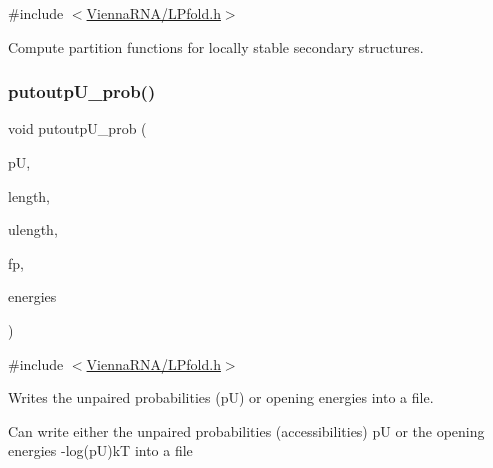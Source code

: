 {\ttfamily \#include $<$\mbox{\hyperlink{_l_pfold_8h}{Vienna\+R\+N\+A/\+L\+Pfold.\+h}}$>$}



Compute partition functions for locally stable secondary structures. 

\mbox{\label{group__local__pf__fold_ga0bcb751860bbf34e3dfee8c2fbdb3ef3}} 
\subsubsection{\texorpdfstring{putoutp\+U\+\_\+prob()}{putoutpU\_prob()}}
{\footnotesize\ttfamily void putoutp\+U\+\_\+prob (\begin{DoxyParamCaption}\item[{double $\ast$$\ast$}]{pU,  }\item[{int}]{length,  }\item[{int}]{ulength,  }\item[{F\+I\+LE $\ast$}]{fp,  }\item[{int}]{energies }\end{DoxyParamCaption})}



{\ttfamily \#include $<$\mbox{\hyperlink{_l_pfold_8h}{Vienna\+R\+N\+A/\+L\+Pfold.\+h}}$>$}



Writes the unpaired probabilities (pU) or opening energies into a file. 

Can write either the unpaired probabilities (accessibilities) pU or the opening energies -\/log(pU)kT into a file


